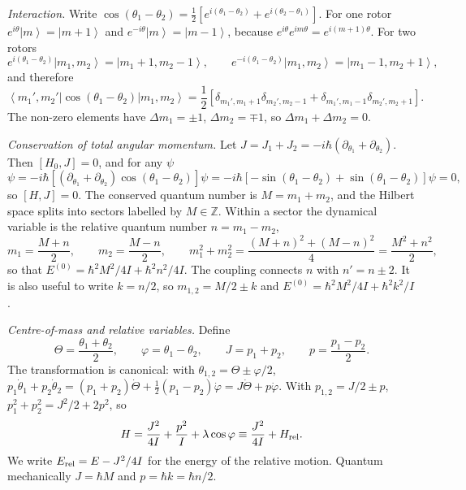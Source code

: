\documentclass[aps,pra,onecolumn,notitlepage,nofootinbib,11pt]{revtex4-2}
\newcommand{\ket}[1]{\left|#1\right\rangle}
\newcommand{\bra}[1]{\left\langle#1\right|}
\newcommand{\Erel}{E_{\rm rel}}
\begin{document}
\emph{Interaction.} Write $\cos(\theta_{1}-\theta_{2})=\frac12\left[e^{i(\theta_{1}-\theta_{2})}
+e^{i(\theta_{2}-\theta_{1})}\right]$. For one rotor
$e^{i\theta}\ket m=\ket{m+1}$ and $e^{-i\theta}\ket m=\ket{m-1}$, because
$e^{i\theta}e^{im\theta}=e^{i(m+1)\theta}$. For two rotors
\begin{equation}
e^{i(\theta_{1}-\theta_{2})}\ket{m_{1},m_{2}}=\ket{m_{1}+1,m_{2}-1},\qquad
e^{-i(\theta_{1}-\theta_{2})}\ket{m_{1},m_{2}}=\ket{m_{1}-1,m_{2}+1},
\end{equation}
and therefore
\begin{equation}
\bra{m_{1}',m_{2}'}\cos(\theta_{1}-\theta_{2})\ket{m_{1},m_{2}}
=\frac12\left[\delta_{m_{1}',m_{1}+1}\delta_{m_{2}',m_{2}-1}
+\delta_{m_{1}',m_{1}-1}\delta_{m_{2}',m_{2}+1}\right].
\label{eq:V}
\end{equation}
The non-zero elements have $\Delta m_{1}=\pm1$, $\Delta m_{2}=\mp1$, so
$\Delta m_{1}+\Delta m_{2}=0$.

\emph{Conservation of total angular momentum.} Let
$J=J_{1}+J_{2}=-i\hbar(\partial_{\theta_{1}}+\partial_{\theta_{2}})$. Then
$[H_{0},J]=0$, and for any $\psi$
\begin{equation}
[J,\cos(\theta_{1}-\theta_{2})]\psi=-i\hbar\left[(\partial_{\theta_{1}}+\partial_{\theta_{2}})
\cos(\theta_{1}-\theta_{2})\right]\psi
=-i\hbar\left[-\sin(\theta_{1}-\theta_{2})+\sin(\theta_{1}-\theta_{2})\right]\psi=0,
\end{equation}
so $[H,J]=0$. The conserved quantum number is $M=m_{1}+m_{2}$, and the Hilbert space
splits into sectors labelled by $M\in\mathbb{Z}$. Within a sector the dynamical
variable is the relative quantum number $n=m_{1}-m_{2}$,
\begin{equation}
m_{1}=\frac{M+n}{2},\qquad m_{2}=\frac{M-n}{2},\qquad
m_{1}^{2}+m_{2}^{2}=\frac{(M+n)^{2}+(M-n)^{2}}{4}=\frac{M^{2}+n^{2}}{2},
\label{eq:nM}
\end{equation}
so that $E^{(0)}=\hbar^{2}M^{2}/4I+\hbar^{2}n^{2}/4I$. The coupling connects $n$ with
$n'=n\pm2$. It is also useful to write $k=n/2$, so $m_{1,2}=M/2\pm k$ and
$E^{(0)}=\hbar^{2}M^{2}/4I+\hbar^{2}k^{2}/I$.

\emph{Centre-of-mass and relative variables.} Define
\begin{equation}
\Theta=\frac{\theta_{1}+\theta_{2}}{2},\qquad\varphi=\theta_{1}-\theta_{2},\qquad
J=p_{1}+p_{2},\qquad p=\frac{p_{1}-p_{2}}{2}.
\label{eq:cmrel}
\end{equation}
The transformation is canonical: with $\theta_{1,2}=\Theta\pm\varphi/2$,
$p_{1}\dot\theta_{1}+p_{2}\dot\theta_{2}=(p_{1}+p_{2})\dot\Theta+\tfrac12(p_{1}-p_{2})
\dot\varphi=J\dot\Theta+p\dot\varphi$. With $p_{1,2}=J/2\pm p$,
$p_{1}^{2}+p_{2}^{2}=J^{2}/2+2p^{2}$, so
\begin{equation}
H=\frac{J^{2}}{4I}+\frac{p^{2}}{I}+\lambda\cos\varphi\equiv\frac{J^{2}}{4I}+H_{\rm rel}.
\label{eq:Hcm}
\end{equation}
We write $\Erel=E-J^{2}/4I$ for the energy of the relative motion. Quantum
mechanically $J=\hbar M$ and $p=\hbar k=\hbar n/2$.
\end{document}
